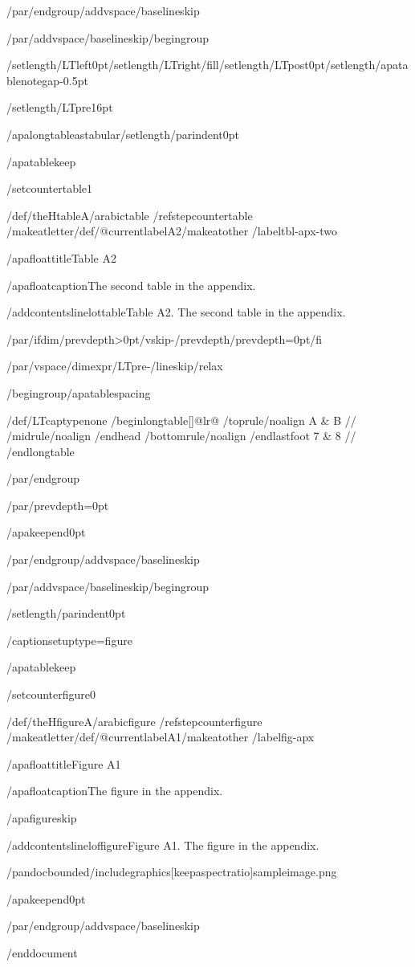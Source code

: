 /par/endgroup/addvspace{/baselineskip}

/par/addvspace{/baselineskip}/begingroup

/setlength{/LTleft}{0pt}/setlength{/LTright}{/fill}/setlength{/LTpost}{0pt}/setlength{/apatablenotegap}{-0.5pt}

/setlength{/LTpre}{16pt}

/apalongtableastabular/setlength{/parindent}{0pt}

/apatablekeep

/setcounter{table}{1}

/def/theHtable{A/arabic{table}}%
/refstepcounter{table}%
/makeatletter/def/@currentlabel{A2}/makeatother%
/label{tbl-apx-two}

/apafloattitle{Table A2}

/apafloatcaption{The second table in the appendix.}

/addcontentsline{lot}{table}{Table A2. The second table in the
appendix.}

/par/ifdim/prevdepth>0pt/vskip-/prevdepth/prevdepth=0pt/fi

/par/vspace{/dimexpr/LTpre-/lineskip/relax}

/begingroup/apatablespacing

{/def/LTcaptype{none} %
/begin{longtable}[]{@{}lr@{}}
/toprule/noalign{}
A & B //
/midrule/noalign{}
/endhead
/bottomrule/noalign{}
/endlastfoot
7 & 8 //
/end{longtable}
}

/par/endgroup

/par/prevdepth=0pt

/apakeepend{0pt}

/par/endgroup/addvspace{/baselineskip}

/par/addvspace{/baselineskip}/begingroup

/setlength{/parindent}{0pt}

/captionsetup{type=figure}

/apatablekeep

/setcounter{figure}{0}

/def/theHfigure{A/arabic{figure}}%
/refstepcounter{figure}%
/makeatletter/def/@currentlabel{A1}/makeatother%
/label{fig-apx}

/apafloattitle{Figure A1}

/apafloatcaption{The figure in the appendix.}

/apafigureskip

/addcontentsline{lof}{figure}{Figure A1. The figure in the appendix.}

/pandocbounded{/includegraphics[keepaspectratio]{sampleimage.png}}

/apakeepend{0pt}

/par/endgroup/addvspace{/baselineskip}




/end{document}

